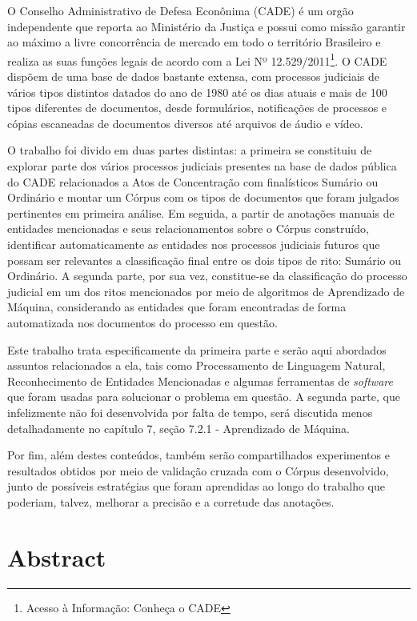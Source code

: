 \documentclass[11pt]{report}
\begin{document}
\indent\indent O Conselho Administrativo de Defesa Econônima (CADE) é um orgão independente que reporta ao Ministério da Justiça e possui como missão garantir ao máximo a livre
concorrência de mercado em todo o território Brasileiro e realiza as suas funções legais de acordo com a Lei Nº 12.529/2011\footnote[1]{Acesso à Informação: Conheça o CADE}.
O CADE dispõem de uma base de dados bastante extensa, com processos judiciais de vários tipos distintos datados do ano de 1980 até os dias atuais e mais de 100 tipos diferentes de
documentos, desde formulários, notificações de processos e cópias escaneadas de documentos diversos até arquivos de áudio e vídeo.

O trabalho foi divido em duas partes distintas: a primeira se constituiu de explorar parte dos vários processos judiciais presentes na base de dados pública do CADE relacionados a Atos de
Concentração com finalísticos Sumário ou Ordinário e montar um Córpus com os tipos de documentos que foram julgados pertinentes em primeira análise. Em seguida, a partir de anotações
manuais de entidades mencionadas e seus relacionamentos sobre o Córpus construído, identificar automaticamente as entidades nos processos judiciais futuros que possam ser relevantes a classificação
final entre os dois tipos de rito: Sumário ou Ordinário. A segunda parte, por sua vez, constitue-se da classificação do processo judicial em um dos ritos mencionados por meio de
algoritmos de Aprendizado de Máquina, considerando as entidades que foram encontradas de forma automatizada nos documentos do processo em questão.

Este trabalho trata especificamente da primeira parte e serão aqui abordados assuntos relacionados a ela, tais como Processamento de Linguagem Natural, Reconhecimento de Entidades
Mencionadas e algumas ferramentas de \textit{software} que foram usadas para solucionar o problema em questão. A segunda parte, que infelizmente não foi desenvolvida por falta de tempo,
será discutida menos detalhadamente no capítulo 7, seção 7.2.1 - Aprendizado de Máquina.

Por fim, além destes conteúdos, também serão compartilhados experimentos e resultados obtidos por meio de validação cruzada com o Córpus desenvolvido, junto de possíveis estratégias que
foram aprendidas ao longo do trabalho que poderiam, talvez, melhorar a precisão e a corretude das anotações.

\pagebreak
\thispagestyle{empty}
\chapter*{Abstract}
\end{document}
